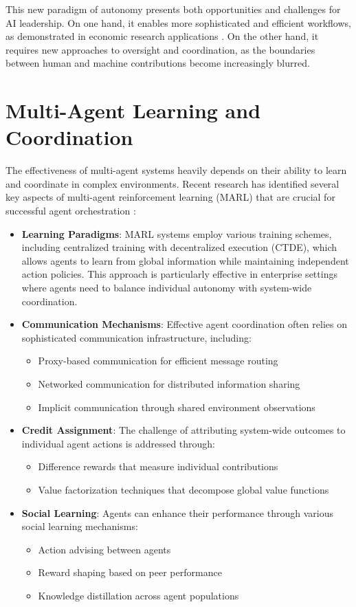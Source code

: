 \documentclass[conference]{IEEEtran}
\begin{document}
This new paradigm of autonomy presents both opportunities and challenges for AI leadership. On one hand, it enables more sophisticated and efficient workflows, as demonstrated in economic research applications \cite{dawid2024agentic}. On the other hand, it requires new approaches to oversight and coordination, as the boundaries between human and machine contributions become increasingly blurred.

\section{Multi-Agent Learning and Coordination}
The effectiveness of multi-agent systems heavily depends on their ability to learn and coordinate in complex environments. Recent research has identified several key aspects of multi-agent reinforcement learning (MARL) that are crucial for successful agent orchestration \cite{huh2024multiagent}:

\begin{itemize}
\item \textbf{Learning Paradigms}: MARL systems employ various training schemes, including centralized training with decentralized execution (CTDE), which allows agents to learn from global information while maintaining independent action policies. This approach is particularly effective in enterprise settings where agents need to balance individual autonomy with system-wide coordination.
\item \textbf{Communication Mechanisms}: Effective agent coordination often relies on sophisticated communication infrastructure, including:
    \begin{itemize}
    \item Proxy-based communication for efficient message routing
    \item Networked communication for distributed information sharing
    \item Implicit communication through shared environment observations
    \end{itemize}
\item \textbf{Credit Assignment}: The challenge of attributing system-wide outcomes to individual agent actions is addressed through:
    \begin{itemize}
    \item Difference rewards that measure individual contributions
    \item Value factorization techniques that decompose global value functions
    \end{itemize}
\item \textbf{Social Learning}: Agents can enhance their performance through various social learning mechanisms:
    \begin{itemize}
    \item Action advising between agents
    \item Reward shaping based on peer performance
    \item Knowledge distillation across agent populations
    \end{itemize}
\end{itemize}
\end{document}
